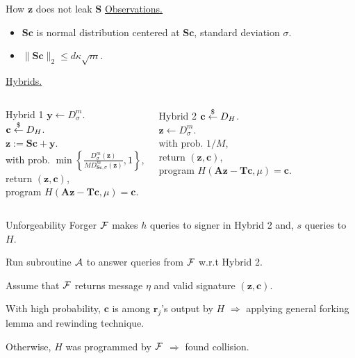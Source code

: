 \begin{frame}{How $\mathbf{z}$ does not leak $\mathbf{S}$}
	\underline{Observations.}
	\begin{itemize}
		\item $\mathbf{S}\mathbf{c}$ is normal distribution centered at $\mathbf{S}\mathbf{c}$, standard deviation $\sigma$.
		\item $\lVert\mathbf{S}\mathbf{c}\rVert_2 \leq d\kappa \sqrt{m}$.
	\end{itemize}
	
	\underline{Hybrids.}
	\begin{columns}[c]
		\begin{expt}{Hybrid 1}
			$\mathbf{y} \leftarrow D_\sigma^m$.\\
			$\mathbf{c} \stackrel{\$}{\leftarrow} D_H$.\\
			$\mathbf{z} := \mathbf{S}\mathbf{c} + \mathbf{y}$.\\
			with prob. $\min\left\{\frac{D^m_\sigma(\mathbf{z})}{MD^m_{\mathbf{S}\mathbf{c},\sigma}(\mathbf{z})},1\right\}$,\\
			\qquad return $(\mathbf{z}, \mathbf{c})$, \\
			\qquad program $H(\mathbf{A}\mathbf{z} - \mathbf{T}\mathbf{c}, \mu) = \mathbf{c}$.\\
		\end{expt}
		\begin{expt}{Hybrid 2}
			$\mathbf{c} \stackrel{\$}{\leftarrow} D_H$.\\
			$\mathbf{z} \leftarrow D_\sigma^m$.\\
			with prob. $1/M$,\\
			\qquad return $(\mathbf{z}, \mathbf{c})$, \\
			\qquad program $H(\mathbf{A}\mathbf{z} - \mathbf{T}\mathbf{c}, \mu) = \mathbf{c}$.\\
		\end{expt}
	\end{columns}
\end{frame}
\begin{frame}{Unforgeability} 
	Forger $\mathcal{F}$ makes $h$ queries to signer in Hybrid 2 and, $s$ queries to $H$. 
	
	Run subroutine $\mathcal{A}$ to answer queries from $\mathcal{F}$ w.r.t Hybrid 2.
	
	Assume that $\mathcal{F}$ returns message $\eta$ and valid signature $(\mathbf{z}, \mathbf{c})$.
	
	With high probability, $\mathbf{c}$ is among $\mathbf{r}_j$'s output by $H$ $\Rightarrow$ applying general forking lemma and rewinding technique. 
	
	Otherwise, $H$ was programmed by $\mathcal{F}$ $\Rightarrow$ found collision.
\end{frame}